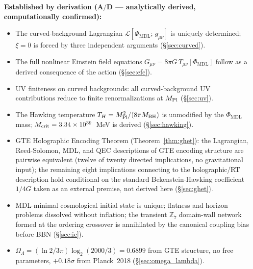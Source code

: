 \documentclass[11pt]{article}
\theoremstyle{remark}
\newcommand{\PHIMDL}{\Phi_{\mathrm{MDL}}}
\newcommand{\ZS}{\mathbb{Z}_7}
\newcommand{\MPl}{M_{\rm Pl}}
\newcommand{\Gmunu}{G_{\mu\nu}}
\newcommand{\Tmunu}{T_{\mu\nu}}
\newcommand{\LL}{\mathcal{L}}
\newcommand{\Omegalam}{\Omega_\Lambda}
\newcommand{\CatAD}{\textbf{A/D}}
\begin{document}
\tableofcontents
\newpage

\begin{tcolorbox}[colback=orange!6,colframe=orange!70!black,
  title={\textbf{What this paper claims and does not claim}},
  fonttitle=\bfseries,left=6pt,right=6pt,top=5pt,bottom=5pt]
\small
\textbf{Established by derivation ($\CatAD$ --- analytically derived, computationally confirmed):}
\begin{itemize}[noitemsep,topsep=2pt]
  \item The curved-background Lagrangian $\LL[\PHIMDL;\,g_{\mu\nu}]$ is uniquely
        determined; $\xi=0$ is forced by three independent arguments
        (\S\ref{sec:curved}).
  \item The full nonlinear Einstein field equations $\Gmunu = 8\pi G\,\Tmunu[\PHIMDL]$
        follow as a derived consequence of the action (\S\ref{sec:efe}).
  \item UV finiteness on curved backgrounds: all curved-background UV contributions
        reduce to finite renormalizations at $\MPl$ (\S\ref{sec:uv}).
  \item The Hawking temperature $T_H = \MPl^2/(8\pi M_{\rm BH})$ is unmodified by
        the $\PHIMDL$ mass; $M_{\rm crit} = 3.34\times10^{39}$~MeV is derived
        (\S\ref{sec:hawking}).
  \item GTE Holographic Encoding Theorem (Theorem~\ref{thm:ghet}): the Lagrangian,
        Reed-Solomon, MDL, and QEC descriptions of GTE encoding structure are
        pairwise equivalent (twelve of twenty directed implications, no gravitational
        input); the remaining eight implications connecting to the holographic/RT
        description hold conditional on the standard Bekenstein-Hawking coefficient
        $1/4G$ taken as an external premise, not derived here (\S\ref{sec:ghet}).
  \item MDL-minimal cosmological initial state is unique; flatness and horizon
        problems dissolved without inflation; the transient $\ZS$ domain-wall
        network formed at the ordering crossover is annihilated by the canonical
        coupling bias before BBN (\S\ref{sec:ic}).
  \item $\Omegalam = (\ln 2/3\pi)\log_2(2000/3) = 0.6899$ from GTE structure,
        no free parameters, $+0.18\sigma$ from Planck~2018 (\S\ref{sec:omega_lambda}).
\end{itemize}

\end{tcolorbox}
\end{document}
